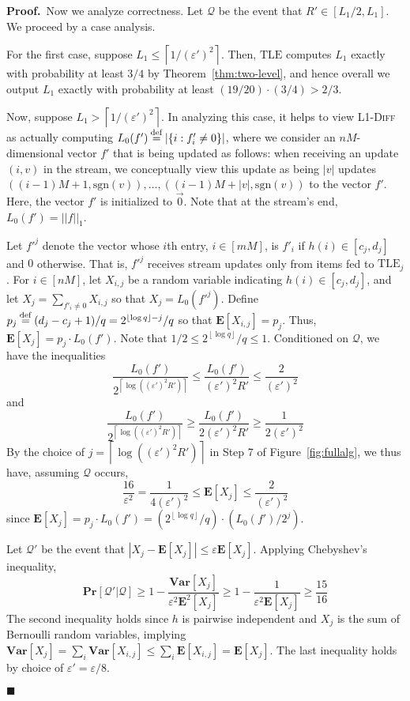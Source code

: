 \documentclass[letterpaper,11pt]{article}
\newcommand{\eps}{\varepsilon}
\newcommand{\ceil}[1]{\left\lceil #1 \right\rceil}
\newcommand{\floor}[1]{\left\lfloor #1 \right\rfloor}
\newcommand{\TLE}{\mathrm{TLE}}
\newcommand{\E}{\mathbf{E}}
\newcommand{\Var}{\mathbf{Var}}
\renewcommand{\Pr}{\mathbf{Pr}}
\newcommand{\Theorem}[1]{Theorem~\ref{thm:#1}}
\newcommand{\Figure}[1]{Figure~\ref{fig:#1}}
\newcommand{\proofbelow}{3pt}
\newcommand{\afterproof}{\hfill $\blacksquare$ \par \vspace{\proofbelow}}
\renewenvironment{proof}{\noindent\textbf{Proof.}\,}{\afterproof}
\newcommand{\eqdef}{\mathbin{\stackrel{\rm def}{=}}}
\begin{document}
\begin{proof}
Now we analyze correctness. Let $\mathcal{Q}$ be the event that
$R'\in [L_1/2,L_1]$. We proceed by a case analysis.

For the first
case, suppose $L_1 \le
\ceil{1/(\eps')^2}$.  Then, $\TLE$
computes $L_1$ exactly with probability at least $3/4$ by
\Theorem{two-level}, and hence overall we output $L_1$ exactly with
probability at least $(19/20)\cdot (3/4) > 2/3$.

Now, suppose $L_1 > \ceil{1/(\eps')^2}$. In analyzing this case, it helps
to view \textsc{L1-Diff} as actually computing
$L_0(f') \eqdef |\{i : f_i' \neq 0\}|$, where we consider an
$nM$-dimensional vector $f'$ that is being updated as follows: when
receiving an update $(i,v)$ in the stream, we conceptually view this
update as being $|v|$ updates
$((i-1)M+1,\mathrm{sgn}(v)),\ldots, ((i-1)M+|v|,\mathrm{sgn}(v))$ to
the vector $f'$. Here, the vector $f'$ is initialized to
$\vec{0}$. Note that at the stream's end, $L_0(f') = ||f||_1$.

Let $f'^j$ denote the vector whose $i$th entry, $i\in[mM]$, is $f'_i$
if $h(i)\in [c_j,d_j]$ and $0$ otherwise.  That is, $f'^j$ receives
stream updates
only from items fed to $\TLE_j$. For $i\in[nM]$, let $X_{i,j}$ be a
random variable indicating $h(i)\in [c_j, d_j]$, and let $X_j =
\sum_{f'_i\neq 0} X_{i,j}$ so that $X_j = L_0(f'^j)$. Define $p_j
\eqdef (d_j-c_j+1)/q =
2^{\floor{\log q} - j}/q$ so that $\E[X_{i,j}] = p_j$. Thus, $\E[X_j]
= p_j\cdot L_0(f')$. 
Note that $1/2\le 2^{\floor{\log q}}/q\le 1$.  Conditioned on
$\mathcal{Q}$, we have the inequalities
$$\frac{L_0(f')}{2^{\ceil{\log((\eps')^2
    R')}}} \le \frac{L_0(f')}{(\eps')^2 R'} \le
\frac{2}{(\eps')^2}$$
and
$$\frac{L_0(f')}{2^{\ceil{\log((\eps')^2 R')}}} \ge
\frac{L_0(f')}{2(\eps')^2 R'} \ge \frac{1}{2(\eps')^2}$$
By
the choice of $j=\ceil{\log((\eps')^2 R')}$ in
Step 7 of \Figure{fullalg}, we thus have, assuming $\mathcal{Q}$
occurs,
$$\frac{16}{\eps^2} = \frac{1}{4(\eps')^2} \le  \E[X_j]
\le \frac{2}{(\eps')^2}$$
since $\E[X_j]
= p_j\cdot L_0(f') = (2^{\floor{\log q}}/q)\cdot (L_0(f')/2^j)$.

Let $\mathcal{Q}'$ be the event that $|X_j - \E[X_j]| \le \eps
\E[X_j]$.  Applying Chebyshev's inequality,
$$\Pr[\mathcal{Q}'|\mathcal{Q}] \ge 1 -
\frac{\Var[X_j]}{\eps^2\E^2[X_j]} \ge
1 - \frac{1}{\eps^2\E[X_j]} \ge \frac{15}{16} $$
The second inequality holds since $h$ is pairwise independent and $X_j$
is the sum of Bernoulli random variables, implying $\Var[X_j] = \sum_i
\Var[X_{i,j}] \le \sum_i \E[X_{i,j}] = \E[X_j]$. The last inequality
holds by choice of $\eps' = \eps/8$.


\end{proof}
\end{document}

